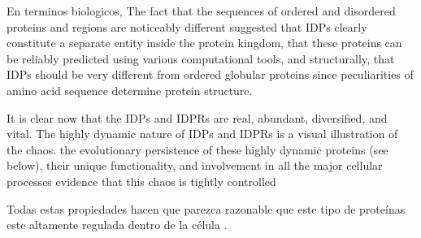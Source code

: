 En terminos biologicos, 
The fact that the sequences of ordered and disordered proteins and regions are noticeably different suggested that IDPs clearly constitute a separate entity inside the protein kingdom, 
that these proteins can be reliably predicted using various computational tools,  and structurally, that IDPs should be very different from ordered globular proteins since peculiarities of amino acid sequence determine protein structure.







It is clear now that the IDPs and IDPRs are real, abundant, diversified, and vital. The highly dynamic nature of IDPs and IDPRs is a visual illustration of the chaos.
the evolutionary persistence of these highly dynamic proteins (see below), their unique functionality, and involvement in all the major cellular processes evidence that this chaos is tightly controlled

Todas estas propiedades hacen que parezca razonable que este tipo de proteínas este altamente regulada dentro de la célula \cite{gsponer2008tight}.

